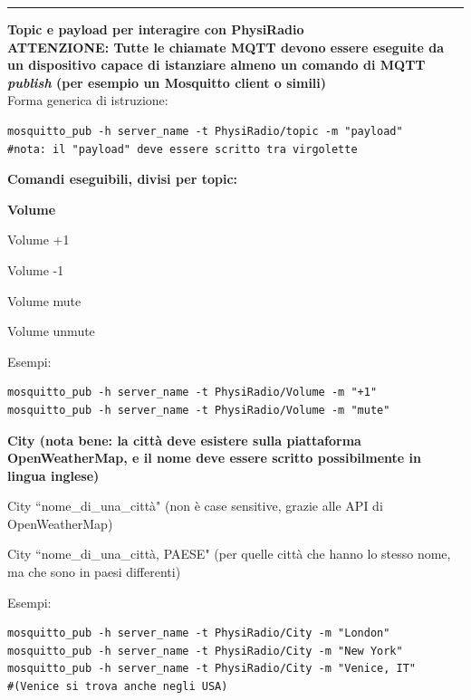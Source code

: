 \documentclass[12pt,a4paper]{report}
\begin{document}
\newpage
\hrule
\medskip

{\large\textbf{Topic e payload per interagire con PhysiRadio}}\\

\textbf{ATTENZIONE: Tutte le chiamate MQTT devono essere eseguite da un dispositivo capace di istanziare almeno un comando di MQTT \textit{publish} (per esempio un Mosquitto client o simili)}\\

Forma generica di istruzione: 

\begin{lstlisting}[style=customBash]
mosquitto_pub -h server_name -t PhysiRadio/topic -m "payload"
#nota: il "payload" deve essere scritto tra virgolette
\end{lstlisting}

\medskip 

{\large\textbf{Comandi eseguibili, divisi per topic:}}

\textbf{Volume}

\begin{compactitem}
	\item
	Volume +1
	\item
	Volume -1
	\item
	Volume mute
	\item
	Volume unmute
\end{compactitem}

Esempi:
\begin{lstlisting}[style=customBash]
mosquitto_pub -h server_name -t PhysiRadio/Volume -m "+1"
mosquitto_pub -h server_name -t PhysiRadio/Volume -m "mute"
\end{lstlisting}


\textbf{City (nota bene: la città deve esistere sulla piattaforma OpenWeatherMap, e il nome deve essere scritto possibilmente in lingua inglese)}

\begin{compactitem}
	\item
	City ``nome\_di\_una\_città" (non è case sensitive, grazie alle API di OpenWeatherMap)
	\item
	City ``nome\_di\_una\_città, PAESE" (per quelle città che hanno lo stesso nome, ma che sono in paesi differenti)
\end{compactitem}

Esempi:
\begin{lstlisting}[style=customBash]
mosquitto_pub -h server_name -t PhysiRadio/City -m "London"
mosquitto_pub -h server_name -t PhysiRadio/City -m "New York"
mosquitto_pub -h server_name -t PhysiRadio/City -m "Venice, IT"
#(Venice si trova anche negli USA)
\end{lstlisting}
\end{document}
